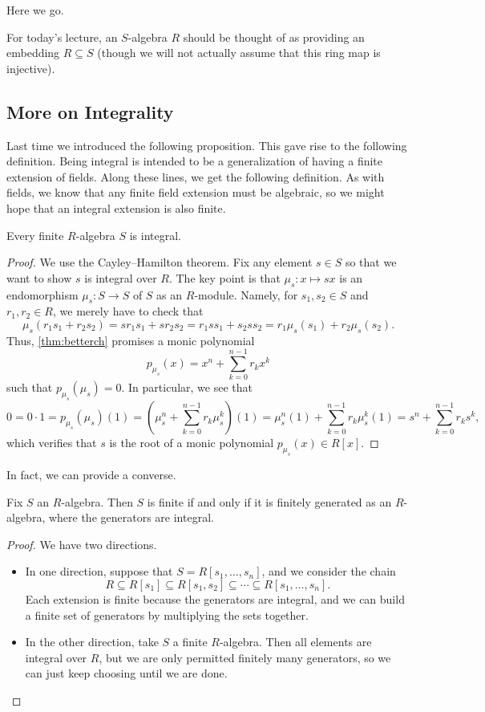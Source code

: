
Here we go.
\begin{convention}
	For today's lecture, an $S$-algebra $R$ should be thought of as providing an embedding $R\subseteq S$ (though we will not actually assume that this ring map is injective).
\end{convention}

\subsection{More on Integrality}
Last time we introduced the following proposition.
\integralitydef*
\noindent This gave rise to the following definition.
\integraldefi*
\noindent Being integral is intended to be a generalization of having a finite extension of fields. Along these lines, we get the following definition.
\finitedefi*
\noindent As with fields, we know that any finite field extension must be algebraic, so we might hope that an integral extension is also finite.
\begin{lemma}
	Every finite $R$-algebra $S$ is integral.
\end{lemma}
\begin{proof}
	We use the Cayley--Hamilton theorem. Fix any element $s\in S$ so that we want to show $s$ is integral over $R$. The key point is that $\mu_s:x\mapsto sx$ is an endomorphism $\mu_s:S\to S$ of $S$ as an $R$-module. Namely, for $s_1,s_2\in S$ and $r_1,r_2\in R$, we merely have to check that
	\[\mu_s(r_1s_1+r_2s_2)=sr_1s_1+sr_2s_2=r_1ss_1+s_2ss_2=r_1\mu_s(s_1)+r_2\mu_s(s_2).\]
	Thus, \autoref{thm:betterch} promises a monic polynomial
	\[p_{\mu_s}(x)=x^n+\sum_{k=0}^{n-1}r_kx^k\]
	such that $p_{\mu_s}(\mu_s)=0$. In particular, we see that
	\[0=0\cdot1=p_{\mu_s}(\mu_s)(1)=\left(\mu_s^n+\sum_{k=0}^{n-1}r_k\mu_s^k\right)(1)=\mu_s^n(1)+\sum_{k=0}^{n-1}r_k\mu_s^k(1)=s^n+\sum_{k=0}^{n-1}r_ks^k,\]
	which verifies that $s$ is the root of a monic polynomial $p_{\mu_s}(x)\in R[x]$.
\end{proof}
In fact, we can provide a converse.
\begin{lemma} \label{lem:betterfinite}
	Fix $S$ an $R$-algebra. Then $S$ is finite if and only if it is finitely generated as an $R$-algebra, where the generators are integral.
\end{lemma}
\begin{proof}
	We have two directions.
	\begin{itemize}
		\item In one direction, suppose that $S=R[s_1,\ldots,s_n]$, and we consider the chain
		\[R\subseteq R[s_1]\subseteq R[s_1,s_2]\subseteq\cdots\subseteq R[s_1,\ldots,s_n].\]
		Each extension is finite because the generators are integral, and we can build a finite set of generators by multiplying the sets together.
		\item In the other direction, take $S$ a finite $R$-algebra. Then all elements are integral over $R$, but we are only permitted finitely many generators, so we can just keep choosing until we are done.
		\qedhere
	\end{itemize}
\end{proof}
